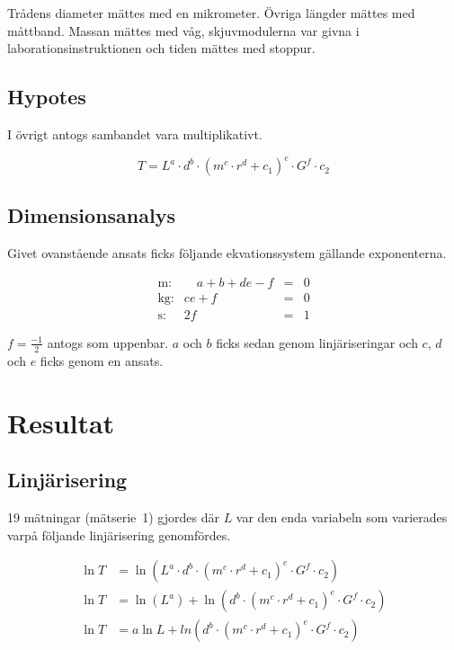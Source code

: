\documentclass[a4paper,12pt]{article}
\begin{document}
Trådens diameter mättes med en mikrometer. Övriga längder mättes med måttband.
Massan mättes med våg, skjuvmodulerna var givna i laborationsinstruktionen och
tiden mättes med stoppur.

\subsection{Hypotes}

I övrigt antogs sambandet vara multiplikativt.

\begin{equation}
  T = L^a \cdot d^b \cdot (m^c \cdot r^d + c_1)^e \cdot G^f \cdot c_2
\end{equation}

\subsection{Dimensionsanalys}

Givet ovanstående ansats ficks följande ekvationssystem gällande exponenterna.

\begin{equation}
  \begin{array}{rrcc}
    \text{m:} & \hspace{1em} a + b + de - f & = & 0 \\
    \text{kg:} & c e + f & = & 0 \\
    \text{s:} & 2f & = & 1
  \end{array}
  \label{eq:system}
\end{equation}

$f = \frac{-1}{2}$ antogs som uppenbar. $a$ och $b$ ficks sedan genom
linjäriseringar och $c$, $d$ och $e$ ficks genom en ansats.

\section{Resultat}

\subsection{Linjärisering}

19 mätningar (mätserie~1) gjordes där $L$ var den enda variabeln som varierades
varpå följande linjärisering genomfördes.

\begin{align}
  \ln T &= \ln (L^a \cdot d^b \cdot (m^c \cdot r^d + c_1)^e \cdot G^f \cdot c_2) \nonumber \\
  \ln T &= \ln (L^a) + \ln (d^b \cdot (m^c \cdot r^d + c_1)^e \cdot G^f \cdot c_2) \nonumber \\
  \ln T &= a\ln L + ln (d^b \cdot (m^c \cdot r^d + c_1)^e \cdot G^f \cdot c_2)  \label{eq:lin_La}
\end{align}
\end{document}
